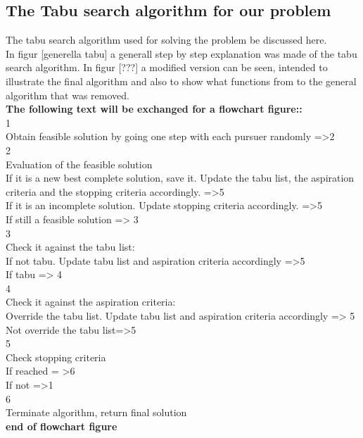 \begin{enumerate}
\subsection{The Tabu search algorithm for our problem}


The tabu search algorithm used for solving the problem be discussed here.\\
In figur [generella tabu] a generall step by step explanation was made of the tabu search algorithm. In figur [???] a modified version can be seen, intended to illustrate the final algorithm and also to show what functions from to the general algorithm that was removed.\\

\textbf{The following text will be exchanged for a flowchart figure::}\\
1\\
Obtain feasible solution by going one step with each pursuer randomly =>2\\
2\\
Evaluation of the feasible solution\\
If it is a new best complete solution, save it. Update the tabu list, the aspiration criteria and the stopping criteria accordingly. =>5\\
If it is an incomplete solution. Update stopping criteria accordingly. =>5\\
If still a feasible solution => 3\\
3\\
Check it against the tabu list:\\
If not tabu. Update tabu list and aspiration criteria accordingly =>5\\
If tabu => 4\\
4\\
Check it against the aspiration criteria:\\
Override the tabu list. Update tabu list and aspiration criteria accordingly => 5\\
Not override the tabu list=>5\\
5\\
Check stopping criteria\\
If reached = >6 \\
If not =>1\\
6\\
Terminate algorithm, return final solution\\
\textbf{end of flowchart figure}\\


\end{enumerate}

